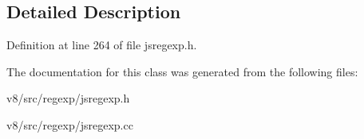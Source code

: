 \subsection{Detailed Description}


Definition at line 264 of file jsregexp.\+h.



The documentation for this class was generated from the following files\+:\begin{DoxyCompactItemize}
\item 
v8/src/regexp/jsregexp.\+h\item 
v8/src/regexp/jsregexp.\+cc\end{DoxyCompactItemize}
